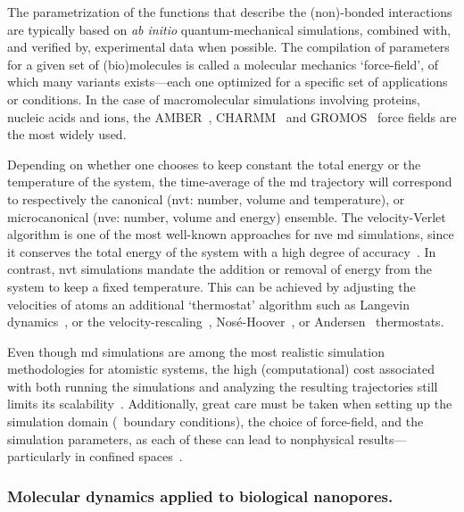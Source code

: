 The parametrization of the functions that describe the (non)-bonded interactions are typically based on
\textit{ab initio} quantum-mechanical simulations, combined with, and verified by, experimental data when
possible. The compilation of parameters for a given set of (bio)molecules is called a molecular mechanics
`force-field', of which many variants exists---each one optimized for a specific set of applications or
conditions. In the case of macromolecular simulations involving proteins, nucleic acids and ions, the
{AMBER}~\cite{Ponder-2003}, {CHARMM}~\cite{Huang-2016} and {GROMOS}~\cite{Oostenbrink-2004} force fields are
the most widely used.

Depending on whether one chooses to keep constant the total energy or the temperature of the system, the
time-average of the \gls{md} trajectory will correspond to respectively the canonical (\gls{nvt}: number,
volume and temperature), or microcanonical (\gls{nve}: number, volume and energy) ensemble. The
velocity-Verlet algorithm is one of the most well-known approaches for \gls{nve} \gls{md} simulations, since
it conserves the total energy of the system with a high degree of accuracy~\cite{Swope-1982}. In contrast,
\gls{nvt} simulations mandate the addition or removal of energy from the system to keep a fixed temperature.
This can be achieved by adjusting the velocities of atoms an additional `thermostat' algorithm such as
Langevin dynamics~\cite{Bussi-2008}, or the velocity-rescaling~\cite{Heyes-1983},
Nos\'{e}-Hoover~\cite{Nose-1984,Hoover-1985}, or Andersen~\cite{Andersen-1980} thermostats.

Even though \gls{md} simulations are among the most realistic simulation methodologies for atomistic
systems, the high (computational) cost associated with both running the simulations and analyzing the
resulting trajectories still limits its scalability~\cite{Vendruscolo-2011,Phillips-2020}. Additionally, great
care must be taken when setting up the simulation domain (\ie~boundary conditions), the choice of force-field,
and the simulation parameters, as each of these can lead to nonphysical results---particularly in confined
spaces~\cite{Wong-ekkabut-2016a}.


\subsubsection{Molecular dynamics applied to biological nanopores.}
%


